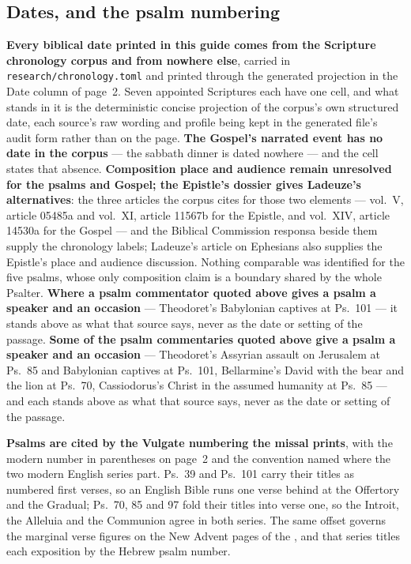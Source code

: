 \subsection*{Dates, and the psalm numbering}

\textbf{Every biblical date printed in this guide comes from the Scripture
chronology corpus and from nowhere else}, carried in
\texttt{research/chronology.toml} and printed through the generated projection
in the Date column of page~2. Seven appointed Scriptures each have one cell, and
what stands in it is the deterministic concise projection of the corpus's own
structured date, each source's raw wording and profile being kept in the
generated file's audit form rather than on the page.
\textbf{The Gospel's narrated event has no date in the corpus} --- the sabbath
dinner is dated nowhere --- and the cell states that absence. \textbf{Composition
place and audience remain unresolved for the psalms and Gospel; the Epistle's
dossier gives Ladeuze's alternatives}: the three  articles the corpus cites for
those two elements --- vol.~V, article 05485a and vol.~XI, article 11567b for
the Epistle, and vol.~XIV, article 14530a for the Gospel --- and the Biblical
Commission responsa beside them supply the chronology labels; Ladeuze's article on Ephesians also supplies the
Epistle's place and audience discussion. Nothing comparable was
identified for the five psalms, whose only composition claim is a boundary
shared by the whole Psalter.%
\ifdefined\TriptychSynthesisEdition{} \textbf{Where a psalm commentator quoted
above gives a psalm a speaker and an occasion} --- Theodoret's Babylonian
captives at Ps.~101 --- it stands above as what that source says, never as the
date or setting of the passage.%
\else{} \textbf{Some of the psalm commentaries quoted above give
a psalm a speaker and an occasion} --- Theodoret's Assyrian assault on
Jerusalem at Ps.~85 and Babylonian captives at Ps.~101, Bellarmine's David
with the bear and the lion at Ps.~70, Cassiodorus's Christ in the assumed
humanity at Ps.~85 --- and each stands above as what that source says, never
as the date or setting of the passage.%
\fi

\textbf{Psalms are cited by the Vulgate numbering the missal prints}, with the
modern number in parentheses on page~2 and the convention named where the two
modern English series part. Ps.~39 and Ps.~101 carry their titles as numbered
first verses, so an English Bible runs one verse behind at the Offertory and the
Gradual; Ps.~70, 85 and 97 fold their titles into verse one, so the Introit, the
Alleluia and the Communion agree in both series. The same offset governs the
marginal verse figures on the New Advent pages of the , and
that series titles each exposition by the Hebrew psalm number.

